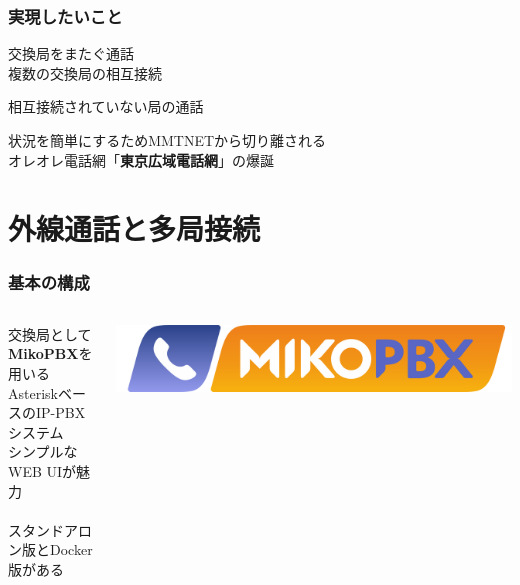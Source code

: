 \documentclass[
  lualatex,
  aspectratio=169,
  14pt
]{beamer}
\begin{document}
\begin{frame}
  \frametitle{実現したいこと}

  \begin{description}[labelwidth=\linewidth,itemsep=.25\zh]
    \item[外線通話と多局接続]
      交換局をまたぐ通話\\
      複数の交換局の相互接続
    \item[交換局ホップ]
      相互接続されていない局の通話
  \end{description}

  状況を簡単にするためMMTNETから切り離される\\
  \hspace{1.5\zw}オレオレ電話網「\textbf{東京広域電話網}」の爆誕
\end{frame}

\section{外線通話と多局接続}

\begin{frame}
  \frametitle{基本の構成}

  \begin{columns}
    \begin{column}{.6\textwidth}
      交換局として\textbf{MikoPBX}を用いる\\
      \hspace{1.5\zw}AsteriskベースのIP-PBXシステム\\
      \hspace{1.5\zw}シンプルなWEB UIが魅力
      \\~\\[-.5\baselineskip]

      スタンドアロン版とDocker版がある
    \end{column}
    \begin{column}{.39\textwidth}
      \includegraphics[width=\linewidth]{./images/mikopbx.png}
    \end{column}
  \end{columns}
\end{frame}
\end{document}
